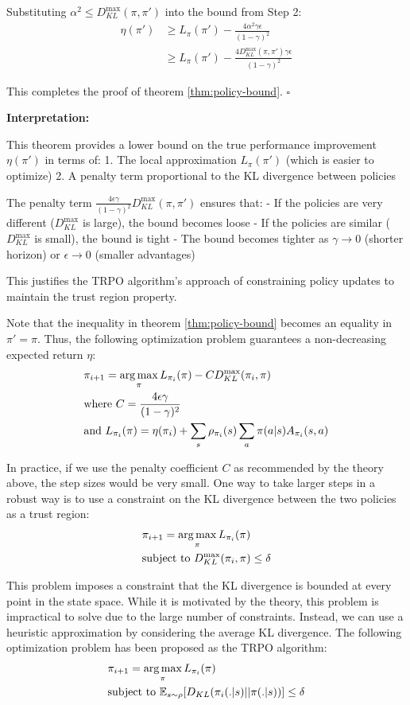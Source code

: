 Substituting $\alpha^2 \le D_{KL}^{\max}(\pi, \pi')$ into the bound from Step 2:
\begin{align}
\eta(\pi') &\ge L_{\pi}(\pi') - \frac{4\alpha^2\gamma\epsilon}{(1-\gamma)^2} \\
&\ge L_{\pi}(\pi') - \frac{4D_{KL}^{\max}(\pi, \pi')\gamma\epsilon}{(1-\gamma)^2}
\end{align}

This completes the proof of theorem \ref{thm:policy-bound}. $\square$

\textbf{Interpretation:}

This theorem provides a lower bound on the true performance improvement $\eta(\pi')$ in terms of:
1. The local approximation $L_{\pi}(\pi')$ (which is easier to optimize)
2. A penalty term proportional to the KL divergence between policies

The penalty term $\frac{4\epsilon\gamma}{(1-\gamma)^2}D_{KL}^{\max}(\pi, \pi')$ ensures that:
- If the policies are very different ($D_{KL}^{\max}$ is large), the bound becomes loose
- If the policies are similar ($D_{KL}^{\max}$ is small), the bound is tight
- The bound becomes tighter as $\gamma \to 0$ (shorter horizon) or $\epsilon \to 0$ (smaller advantages)

This justifies the TRPO algorithm's approach of constraining policy updates to maintain the trust region property.


Note that the inequality in theorem \ref{thm:policy-bound} becomes an equality in $\pi' = \pi$. Thus, the following optimization problem guarantees a non-decreasing expected return $\eta$:
\begin{align*}
    &\pi_{i + 1} = \operatorname*{arg\,max}_{\pi} L_{\pi_i}(\pi) - CD_{KL}^{\max}(\pi_i, \pi)\\
    &\text{where } C = \frac{4\epsilon\gamma}{(1-\gamma)^2}\\
    &\text{and } L_{\pi_i}(\pi) = \eta(\pi_i) + \sum_{s}\rho_{\pi_i}(s)\sum_{a}\pi(a|s)A_{\pi_i}(s, a)
\end{align*}

In practice, if we use the penalty coefficient $C$ as recommended by the theory above, the step sizes would be very small. One way to take larger steps in a robust way is to use a constraint on the KL divergence between the two policies as a trust region:
\begin{align*}
    &\pi_{i + 1} = \operatorname*{arg\,max}_{\pi} L_{\pi_i}(\pi)\\
    &\text{subject to } D_{KL}^{\max}(\pi_i, \pi) \le \delta
\end{align*}

This problem imposes a constraint that the KL divergence is bounded at every point in the state space. While it is motivated by the theory, this problem is impractical to solve due to the large number of constraints. Instead, we can use a heuristic approximation by considering the average KL divergence. The following optimization problem has been proposed as the TRPO algorithm:
\begin{align*}
    &\pi_{i + 1} = \operatorname*{arg\,max}_{\pi} L_{\pi_i}(\pi)\\
    &\text{subject to } \mathbb{E}_{s \sim \rho}[D_{KL}(\pi_i (.|s) || \pi(.|s))] \le \delta
\end{align*}